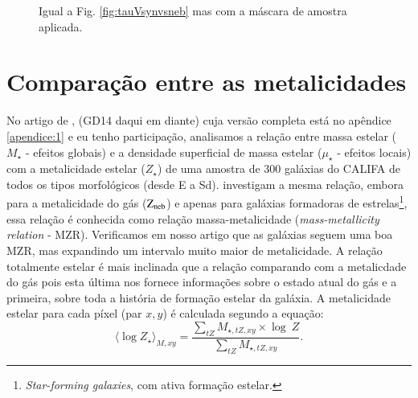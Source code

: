 \begin{figure}
	\centering
	\caption[Comparação entre os coeficientes de extinção (com máscara).]
	{Igual a Fig. \ref{fig:tauVsynvsneb} mas com a máscara de amostra aplicada.} 
	\label{fig:tauVsynvsnebMask}
\end{figure}


\section{Comparação entre as metalicidades}
\label{sec:synvsneb:Z}

No artigo de \citet{GonzalezDelgado.etal.2014b}, (GD14 daqui em diante) cuja versão completa está no
apêndice \ref{apendice:1} e eu tenho participação, analisamos a relação entre massa estelar
($M_\star$ - efeitos globais) e a densidade superficial de massa estelar ($\mu_\star$ - efeitos
locais) com a metalicidade estelar ($Z_\star$) de uma amostra de 300 galáxias do CALIFA de todos os
tipos morfológicos (desde E a Sd). \citet{Tremonti.etal.2004a} investigam a mesma relação, embora
para a metalicidade do gás ($\mathrm{Z}_{\mathrm{neb}}$) e apenas para galáxias formadoras de estrelas\footnote{{\em
Star-forming galaxies}, com ativa formação estelar.}, essa relação é conhecida como relação
massa-metalicidade ({\em mass-metallicity relation} - MZR). Verificamos em nosso artigo que as
galáxias seguem uma boa MZR, mas expandindo um intervalo muito maior de metalicidade. A relação
totalmente estelar é mais inclinada que a relação comparando com a metalicdade do gás pois esta
última nos fornece informações sobre o estado atual do gás e a primeira, sobre toda a história de
formação estelar da galáxia. A metalicidade estelar para cada píxel (par $x,y$) é calculada segundo
a equação:
\begin{equation}
 	\label{eq:logZmass}
 	\langle \log Z_\star \rangle_{M,xy} = 
	\frac{ \sum_{tZ} M_{\star,tZ,xy} \times \log\ Z}{
	\sum_{tZ} M_{\star,tZ,xy} }.
\end{equation}

